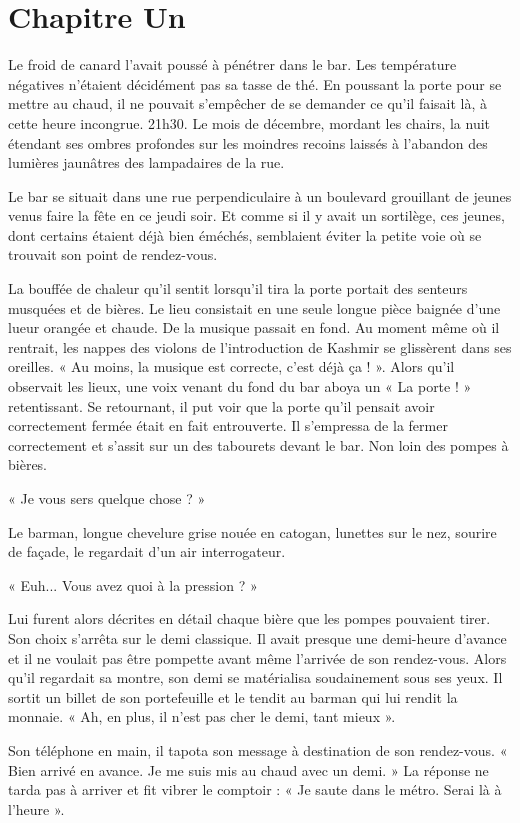 \chapter[Chapitre Un]{Chapitre Un}
Le froid de canard l'avait poussé à pénétrer dans le bar. Les température négatives n'étaient décidément pas sa tasse de
thé. En poussant la porte pour se mettre au chaud, il ne pouvait s'empêcher de se demander ce qu'il faisait là, à cette
heure incongrue. 21h30. Le mois de décembre, mordant les chairs, la nuit étendant ses ombres profondes sur les moindres
recoins laissés à l'abandon des lumières jaunâtres des lampadaires de la rue.

Le bar se situait dans une rue perpendiculaire à un boulevard grouillant de jeunes venus faire la fête en ce jeudi soir.
Et comme si il y avait un sortilège, ces jeunes, dont certains étaient déjà bien éméchés, semblaient éviter la petite
voie où se trouvait son point de rendez-vous.

La bouffée de chaleur qu'il sentit lorsqu'il tira la porte portait des senteurs musquées et de bières. Le lieu
consistait en une seule longue pièce baignée d'une lueur orangée et chaude. De la musique passait en fond. Au moment
même où il rentrait, les nappes des violons de l'introduction de Kashmir se glissèrent dans ses oreilles. « Au moins, la
musique est correcte, c'est déjà ça ! ». Alors qu'il observait les lieux, une voix venant du fond du bar aboya un « La
porte ! » retentissant. Se retournant, il put voir que la porte qu'il pensait avoir correctement fermée était en fait
entrouverte. Il s'empressa de la fermer correctement et s'assit sur un des tabourets devant le bar. Non loin des pompes
à bières.

« Je vous sers quelque chose ? »

Le barman, longue chevelure grise nouée en catogan, lunettes sur le nez, sourire de façade, le regardait d'un air
interrogateur.

« Euh... Vous avez quoi à la pression ? »

Lui furent alors décrites en détail chaque bière que les pompes pouvaient tirer. Son choix s'arrêta sur le demi
classique. Il avait presque une demi-heure d'avance et il ne voulait pas être pompette avant même l'arrivée de son
rendez-vous. Alors qu'il regardait sa montre, son demi se matérialisa soudainement sous ses yeux. Il sortit un billet de
son portefeuille et le tendit au barman qui lui rendit la monnaie. « Ah, en plus, il n'est pas cher le demi, tant mieux ».

Son téléphone en main, il tapota son message à destination de son rendez-vous. « Bien arrivé en avance. Je me suis mis au
chaud avec un demi. » La réponse ne tarda pas à arriver et fit vibrer le comptoir : « Je saute dans le métro. Serai là à
l'heure ».

